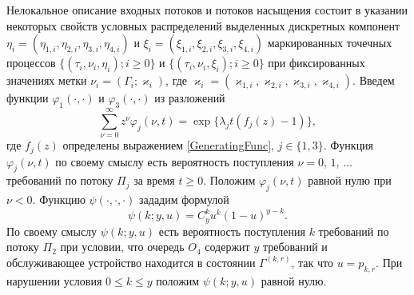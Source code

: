 \documentclass[11pt]{ubs}
\begin{document}
Нелокальное описание входных потоков и потоков насыщения состоит в указании некоторых свойств условных распределений выделенных дискретных компонент $\eta_i=(\eta_{1,i},\eta_{2,i}, \eta_{3,i}, \eta_{4,i})$ и $\xi_i=(\xi_{1,i}, \xi_{2,i}, \xi_{3,i}, \xi_{4,i})$ маркированных точечных процессов \linebreak $\{(\tau_i, \nu_i, \eta_i); i\geqslant 0\}$ и $\{(\tau_i, \nu_i, \xi_i); i\geqslant 0\}$ при фиксированных значениях метки $\nu_i = (\Gamma_i;\varkappa_i)$, где $\varkappa_i=(\varkappa_{1,i},\varkappa_{2,i},\varkappa_{3,i},\varkappa_{4,i})$. 
Введем функции $\varphi_1(\cdot,\cdot)$ и $\varphi_3(\cdot,\cdot)$ из разложений 
\begin{equation*}
\sum_{\nu=0}^{\infty} z^\nu\varphi_j(\nu,t) = \exp\{\lambda_j t (f_j(z)-1)\},
\end{equation*}
где $f_j(z)$ определены выражением \eqref{GeneratingFunc}, $j \in \{1,3\}$. Функция $\varphi_j(\nu,t)$ по своему смыслу есть вероятность поступления $\nu=0$, $1$, $\ldots$ требований по потоку $\Pi_j$ за время $t \geqslant 0$. Положим $\varphi_j(\nu,t)$ равной нулю при $\nu < 0$. Функцию $\psi(\cdot,\cdot,\cdot)$ зададим формулой
\begin{equation*}
\psi(k;y,u)=C_y^k u^k (1-u)^{y-k}.	
\end{equation*}
По своему смыслу $\psi(k;y,u)$ есть вероятность поступления $k$ требований по потоку $\Pi_2$ при условии, что очередь $O_4$ содержит $y$ требований и обслуживающее устройство находится в состоянии $\Gamma^{(k,r)}$, так что $u=p_{k,r}$. При нарушении условия $ 0\leqslant k \leqslant y$ положим $\psi(k;y,u)$ равной нулю.
\end{document}
